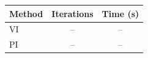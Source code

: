 \begin{tabular}{lcc}
\toprule
Method & Iterations & Time (s) \\
\midrule
VI & -- & -- \\
PI & -- & -- \\
\bottomrule
\end{tabular}
